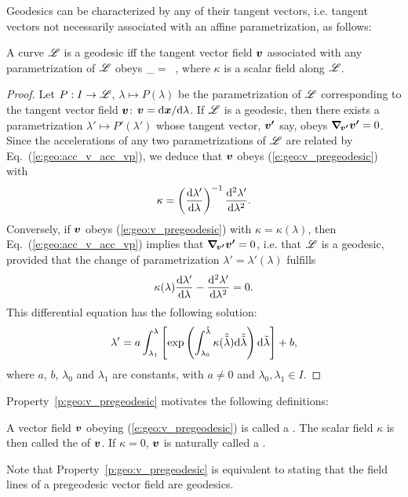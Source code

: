 Geodesics can be characterized by any of their tangent vectors, i.e.
tangent vectors not necessarily associated with an affine parametrization, as follows:
\begin{prop}
\label{p:geo:v_pregeodesic}
A curve $\mathscr{L}$ is a geodesic
iff the tangent vector field $\bm{v}$ associated with any parametrization
of $\mathscr{L}$ obeys
\be \label{e:geo:v_pregeodesic}
    \wnab_{\!} = \kappa\,  ,
\ee
where $\kappa$ is a scalar field along $\mathscr{L}$.
\end{prop}
\begin{proof}
Let $P: I\to \mathscr{L}$, $\lambda\mapsto P(\lambda)$ be the parametrization of $\mathscr{L}$
corresponding to the tangent vector field $\bm{v}$: $\bm{v} = \mathrm{d}\bm{x}/\mathrm{d}\lambda$.
If $\mathscr{L}$ is a geodesic, then there exists a parametrization
$\lambda'\mapsto P'(\lambda')$ whose tangent vector, $\bm{v'}$ say, obeys
$\bm{\nabla}_{\!\bm{v'}}\bm{v'} = 0$. Since the accelerations of any two parametrizations of $\mathscr{L}$
are related by Eq.~(\ref{e:geo:acc_v_acc_vp}), we deduce that $\bm{v}$ obeys
(\ref{e:geo:v_pregeodesic}) with
\[
    \kappa = \left( \frac{\mathrm{d}\lambda'}{\mathrm{d}\lambda} \right)^{-1}
        \frac{\mathrm{d}^2\lambda'}{\mathrm{d}\lambda^2} .
\]
Conversely, if $\bm{v}$ obeys (\ref{e:geo:v_pregeodesic}) with $\kappa=\kappa(\lambda)$,
then Eq.~(\ref{e:geo:acc_v_acc_vp}) implies that $\bm{\nabla}_{\!\bm{v'}}\bm{v'} = 0$,
i.e. that $\mathscr{L}$ is a geodesic, provided that the change of
parametrization $\lambda' = \lambda'(\lambda)$ fulfills
\[
    \kappa(\lambda) \frac{\mathrm{d}\lambda'}{\mathrm{d}\lambda} -  \frac{\mathrm{d}^2\lambda'}{\mathrm{d}\lambda^2} = 0 .
\]
This differential equation has the following solution:
\[
    \lambda' = a \int_{\lambda_1}^\lambda \left[ \exp \left(
    \int_{\lambda_0}^{\tilde{\lambda}} \kappa(\tilde{\tilde{\lambda}})
    \mathrm{d}\tilde{\tilde{\lambda}}\right) \mathrm{d}\tilde\lambda
    \right] + b,
\]
where $a$, $b$, $\lambda_0$ and $\lambda_1$ are constants, with $a\not = 0$ and $\lambda_0,\lambda_1\in I$.
\end{proof}
Property~\ref{p:geo:v_pregeodesic} motivates the following definitions:
\begin{greybox}
A vector field $\bm{v}$ obeying (\ref{e:geo:v_pregeodesic}) is called
a .
The scalar field $\kappa$ is then called the  of $\bm{v}$.
If $\kappa=0$, $\bm{v}$ is naturally called a .
\end{greybox}
Note that Property~\ref{p:geo:v_pregeodesic} is equivalent to stating that the
field lines of a pregeodesic vector field are geodesics.

